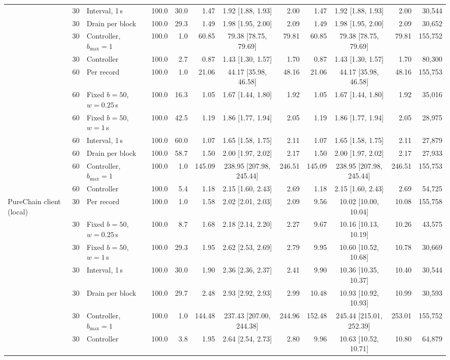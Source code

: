 \begin{table}[t]
\begin{adjustbox}{max width=\textwidth}
\begin{tabular}{lllrrrcrrcrr}
 & 30 & Interval, 1\,s & 100.0 & 30.0 & 1.47 & 1.92 [1.88, 1.93] & 2.00 & 1.47 & 1.92 [1.88, 1.93] & 2.00 & 30,544 \\
 & 30 & Drain per block & 100.0 & 29.3 & 1.49 & 1.98 [1.95, 2.00] & 2.09 & 1.49 & 1.98 [1.95, 2.00] & 2.09 & 30,652 \\
 & 30 & Controller, $b_{\max}{=}1$ & 100.0 & 1.0 & 60.85 & 79.38 [78.75, 79.69] & 79.81 & 60.85 & 79.38 [78.75, 79.69] & 79.81 & 155,752 \\
 & 30 & Controller & 100.0 & 2.7 & 0.87 & 1.43 [1.30, 1.57] & 1.70 & 0.87 & 1.43 [1.30, 1.57] & 1.70 & 80,300 \\
 & 60 & Per record & 100.0 & 1.0 & 21.06 & 44.17 [35.98, 46.58] & 48.16 & 21.06 & 44.17 [35.98, 46.58] & 48.16 & 155,753 \\
 & 60 & Fixed $b{=}50$, $w{=}0.25$\,s & 100.0 & 16.3 & 1.05 & 1.67 [1.44, 1.80] & 1.92 & 1.05 & 1.67 [1.44, 1.80] & 1.92 & 35,016 \\
 & 60 & Fixed $b{=}50$, $w{=}1$\,s & 100.0 & 42.5 & 1.19 & 1.86 [1.77, 1.94] & 2.05 & 1.19 & 1.86 [1.77, 1.94] & 2.05 & 28,975 \\
 & 60 & Interval, 1\,s & 100.0 & 60.0 & 1.07 & 1.65 [1.58, 1.75] & 2.11 & 1.07 & 1.65 [1.58, 1.75] & 2.11 & 27,879 \\
 & 60 & Drain per block & 100.0 & 58.7 & 1.50 & 2.00 [1.97, 2.02] & 2.17 & 1.50 & 2.00 [1.97, 2.02] & 2.17 & 27,933 \\
 & 60 & Controller, $b_{\max}{=}1$ & 100.0 & 1.0 & 145.09 & 238.95 [207.98, 245.44] & 246.51 & 145.09 & 238.95 [207.98, 245.44] & 246.51 & 155,753 \\
 & 60 & Controller & 100.0 & 5.4 & 1.18 & 2.15 [1.60, 2.43] & 2.69 & 1.18 & 2.15 [1.60, 2.43] & 2.69 & 54,725 \\
PureChain client (local) & 30 & Per record & 100.0 & 1.0 & 1.58 & 2.02 [2.01, 2.03] & 2.09 & 9.56 & 10.02 [10.00, 10.04] & 10.08 & 155,758 \\
 & 30 & Fixed $b{=}50$, $w{=}0.25$\,s & 100.0 & 8.7 & 1.68 & 2.18 [2.14, 2.20] & 2.27 & 9.67 & 10.16 [10.13, 10.19] & 10.26 & 43,575 \\
 & 30 & Fixed $b{=}50$, $w{=}1$\,s & 100.0 & 29.3 & 1.95 & 2.62 [2.53, 2.69] & 2.79 & 9.95 & 10.60 [10.52, 10.68] & 10.78 & 30,669 \\
 & 30 & Interval, 1\,s & 100.0 & 30.0 & 1.90 & 2.36 [2.36, 2.37] & 2.41 & 9.90 & 10.36 [10.35, 10.37] & 10.40 & 30,544 \\
 & 30 & Drain per block & 100.0 & 29.7 & 2.48 & 2.93 [2.92, 2.93] & 2.99 & 10.48 & 10.93 [10.92, 10.93] & 10.99 & 30,593 \\
 & 30 & Controller, $b_{\max}{=}1$ & 100.0 & 1.0 & 144.48 & 237.43 [207.00, 244.38] & 244.96 & 152.48 & 245.44 [215.01, 252.39] & 253.01 & 155,752 \\
 & 30 & Controller & 100.0 & 3.8 & 1.95 & 2.64 [2.54, 2.73] & 2.80 & 9.96 & 10.63 [10.52, 10.71] & 10.80 & 64,879 \\
\bottomrule
\end{tabular}\end{adjustbox}
\end{table}
